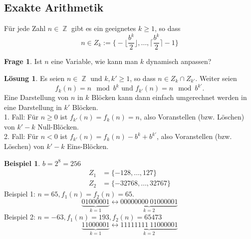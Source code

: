 \documentclass[a4paper,12pt]{article}
\DeclareMathOperator{\Z}{\mathbb Z}
\theoremstyle{definition}
\newtheorem*{example}{Beispiel}
\newtheorem*{frage}{Frage}
\newtheorem*{loesung}{Lösung}
\begin{document}
	\subsection{Exakte Arithmetik}
	Für jede Zahl $n \in \Z$ gibt es ein geeignetes $k \geq 1$, so dass 
	\[
		n \in Z_k :=\bigg\{-\bigg\lfloor \frac{b^k}{2}\bigg\rfloor, \ldots, \bigg\lceil \frac{b^k}{2} \bigg\rceil- 1\bigg\}
	\]
	\begin{frage}
		Ist $n$ eine Variable, wie kann man $k$ dynamisch anpassen?
	\end{frage}
	\begin{loesung}
		Es seien $n \in \Z$ und $k, k' \geq 1$, so dass $n \in Z_k \cap Z_{k'}$. Weiter seien
		\[
			f_k(n) = n \mod b^k \text{ und } f_{k'}(n) = n \mod b^{k'}.
		\]
		Eine Darstellung von $n$ in $k$ Blöcken kann dann einfach umgerechnet werden in eine Darstellung in $k'$ Blöcken.\\[2ex]
		1. Fall: Für $n \geq 0$ ist $f_{k'}(n) = f_k(n) = n$, also Voranstellen (bzw. Löschen) von $k' - k$ Null-Blöcken.\\[2ex]
		2. Fall: Für $n < 0$ ist $f_{k'}(n) = f_k(n) - b^k + b^{k'}$, also Voranstellen (bzw. Löschen) von $k'-k$ Eins-Blöcken.
		\begin{example}
			$b = 2^8 = 256$
			\begin{align*}
				Z_1 &= \{-128, \ldots, 127\}\\
				Z_2 &= \{-32768, \ldots, 32767\}
			\end{align*}
			Beispiel 1: $n = 65, f_1(n) = f_2(n) = 65$.
			\[
				\underbrace{01000001}_{k = 1} \longleftrightarrow \underbrace{00000000~01000001}_{k=2}
			\]
			Beispiel 2: $n = -63, f_1(n) = 193, f_2(n) = 65473$
			\[
				\underbrace{11000001}_{k = 1} \longleftrightarrow \underbrace{11111111~11000001}_{k=2}
			\]
		\end{example}
	\end{loesung}
\end{document}
